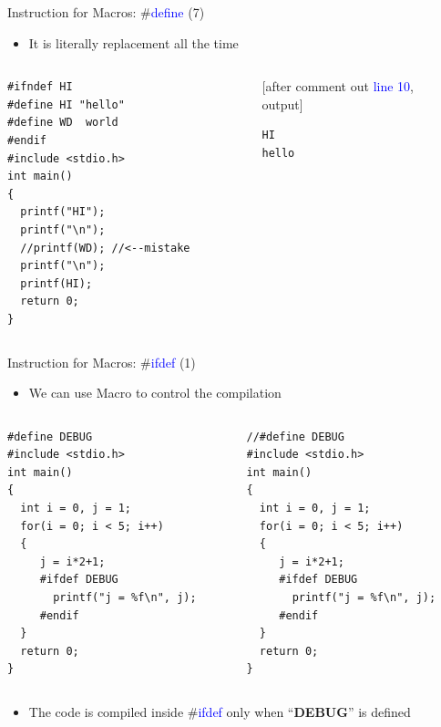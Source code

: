 \begin{frame}[fragile]{Instruction for Macros: \#\textcolor{blue}{define} (7)}
\begin{itemize}
	\item {It is literally replacement all the time}
\end{itemize}
\begin{columns}
\begin{column}{0.46\linewidth}
\begin{lstlisting}
#ifndef HI
#define HI "hello"
#define WD	world
#endif
#include <stdio.h>
int main()
{
  printf("HI");
  printf("\n");
  //printf(WD); //<--mistake
  printf("\n");
  printf(HI);
  return 0;
}
\end{lstlisting}
\end{column}
\begin{column}{0.35\linewidth}

[after comment out \textcolor{blue}{line 10},\\output]
\begin{lstlisting}
HI
hello
\end{lstlisting}
\end{column}
\end{columns}
\end{frame}

\begin{frame}[fragile]{Instruction for Macros: \#\textcolor{blue}{ifdef} (1)}
\begin{itemize}
	\item {We can use Macro to control the compilation}
\end{itemize}
\vspace{-0.2in}
\begin{columns}
\begin{column}{0.48\linewidth}
\begin{lstlisting}
#define DEBUG
#include <stdio.h>
int main()
{
  int i = 0, j = 1;
  for(i = 0; i < 5; i++)
  {
     j = i*2+1;
     #ifdef DEBUG
       printf("j = %f\n", j);
     #endif
  }
  return 0;
}
\end{lstlisting}
\end{column}
\begin{column}{0.48\linewidth}
\begin{lstlisting}
//#define DEBUG
#include <stdio.h>
int main()
{
  int i = 0, j = 1;
  for(i = 0; i < 5; i++)
  {
     j = i*2+1;
     #ifdef DEBUG
       printf("j = %f\n", j);
     #endif
  }
  return 0;
}
\end{lstlisting}
\end{column}
\end{columns}
\vspace{-0.2in}
\begin{itemize}
	\item {The code is compiled inside \#\textcolor{blue}{ifdef} only when ``\textbf{DEBUG}'' is defined}
\end{itemize}
\end{frame}

